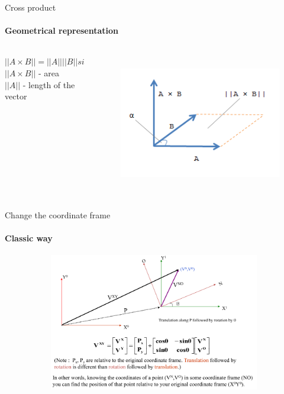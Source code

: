 \documentclass[aspectratio=169,xcolor=table,10pt, notes=hide]{beamer}
\begin{document}
    \begin{frame}[t]{Cross product}
    \framesubtitle{Geometrical representation}
    \begin{columns}[T,onlytextwidth]
        \begin{column}{0.49\textwidth}
            \flushright
            $||A \times B||=||A||||B|| sin\alpha$\\
            $||A \times B||$ - area\\
            $||A||$ - length of the vector  
        \end{column}
        \begin{column}{0.49\textwidth}
            \begin{figure}[H]
                \centering\includegraphics[height=6cm,width=1\textwidth,keepaspectratio]{image37.png}
        \end{figure}
        \end{column}
    \end{columns}
        
    \end{frame}
    
    \begin{frame}[t]{Change the coordinate frame}
    \framesubtitle{Classic way}
        \begin{figure}[H]
            \centering\includegraphics[height=6cm,width=1\textwidth,keepaspectratio]{image28.png}
            \label{fig:image28}
        \end{figure}
    \end{frame}
    
\end{document}

